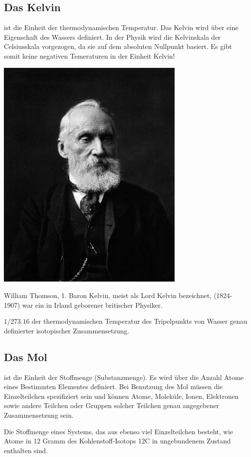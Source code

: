 \subsection{Das Kelvin}
ist die Einheit der thermodynamischen Temperatur. Das Kelvin wird über eine Eigenschaft des Wassers definiert. In der Physik wird die Kelvinskala der Celsiusskala vorgezogen, da sie auf dem absoluten Nullpunkt basiert. Es gibt somit keine negativen Temeraturen in der Einheit Kelvin!
\begin{marginfigure}
    \includegraphics[width=0.7\textwidth]{Bilder/kelvin.jpg}
    \label{fig:kelvinfig}
    \caption{William Thomson, 1. Baron Kelvin, meist als Lord Kelvin bezeichnet, (1824-1907) war ein in Irland geborener britischer Physiker.}
\end{marginfigure}
\begin{definition}
$1/273.16$ der thermodynamischen Temperatur des Tripelpunkts von Wasser genau definierter isotopischer Zusammensetzung.
\end{definition}

\subsection{Das Mol} ist die Einheit der Stoffmenge (Substanzmenge). Es wird über die Anzahl Atome eines Bestimmten Elementes definiert.  Bei Benutzung des Mol müssen die Einzelteilchen spezifiziert sein und können Atome, Moleküle, Ionen, Elektronen sowie andere Teilchen oder Gruppen solcher Teilchen genau angegebener Zusammensetzung sein.
\begin{definition}
Die Stoffmenge eines Systems, das aus ebenso viel Einzelteilchen besteht, wie Atome in 12 Gramm des Kohlenstoff-Isotops 12C in ungebundenem Zustand enthalten sind.
\end{definition}

